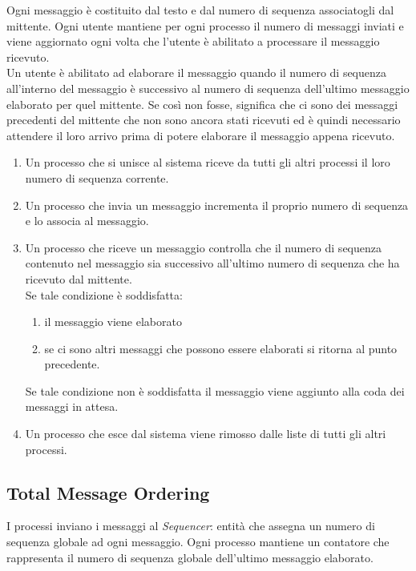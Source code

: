 \documentclass[a4paper]{article}
\begin{document}
Ogni messaggio è costituito dal testo e dal numero di sequenza associatogli dal mittente.
Ogni utente mantiene per ogni processo il numero di messaggi inviati e viene aggiornato ogni volta che l'utente è abilitato a processare il messaggio ricevuto.\\
Un utente è abilitato ad elaborare il messaggio quando il numero di sequenza all'interno del messaggio è successivo al numero di sequenza dell'ultimo messaggio elaborato per quel mittente.
Se così non fosse, significa che ci sono dei messaggi precedenti del mittente che non sono ancora stati ricevuti ed è quindi necessario attendere il loro arrivo prima di potere elaborare il messaggio appena ricevuto.
\begin{enumerate}
    \item Un processo che si unisce al sistema riceve da tutti gli altri processi il loro numero di sequenza corrente.  
    \item Un processo che invia un messaggio incrementa il proprio numero di sequenza e lo associa al messaggio. 
    \item Un processo che riceve un messaggio controlla che il numero di sequenza contenuto nel messaggio sia successivo all'ultimo numero di sequenza che ha ricevuto dal mittente.\\
    Se tale condizione è soddisfatta:
    \begin{enumerate}
        \item il messaggio viene elaborato
        \item se ci sono altri messaggi che possono essere elaborati si ritorna al punto precedente.
    \end{enumerate}
    Se tale condizione non è soddisfatta il messaggio viene aggiunto alla coda dei messaggi in attesa.
    \item Un processo che esce dal sistema viene rimosso dalle liste di tutti gli altri processi.
\end{enumerate}

\subsection{Total Message Ordering}\label{total-message-ordering}

I processi inviano i messaggi al \textit{Sequencer}: entità che assegna un numero di sequenza globale ad ogni messaggio.
Ogni processo mantiene un contatore che rappresenta il numero di sequenza globale dell'ultimo messaggio elaborato.
\end{document}
